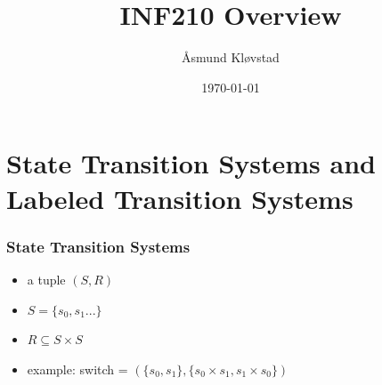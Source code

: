 \documentclass{beamer}
\title[INF210]{INF210 Overview} %
\author{Åsmund Kløvstad} %
\institute[UiB] %
{
Universitetet i Bergen \\ %
}
\date{\today} %
\begin{document}
\begin{frame}
\titlepage %
\end{frame}



\section{State Transition Systems and Labeled Transition Systems} %

\begin{frame}
\frametitle{State Transition Systems}
\begin{itemize}
\item a tuple $(S, R)$
  \item $S = \{s_0,s_1...\}$
\item $R \subseteq S \times S$
  \item example: switch = $(\{s_0, s_1\}, \{ s_0 \times s_1, s_1 \times s_0\})$
\end{itemize}

\begin{figure}
  \centering
{}
  \end{figure}
\end{frame}
\end{document}
